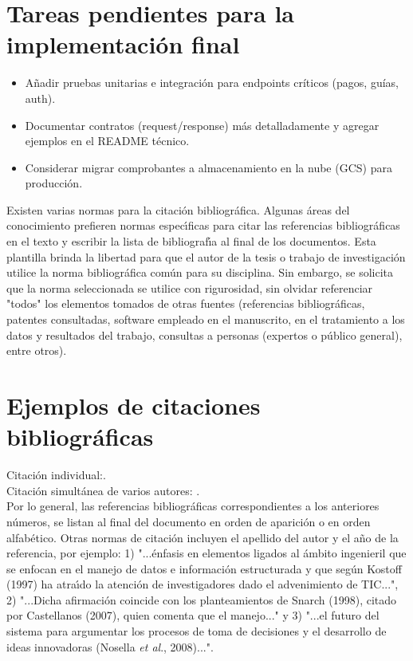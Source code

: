 \section{Tareas pendientes para la implementación final}
\begin{itemize}
\item Añadir pruebas unitarias e integración para endpoints críticos (pagos, guías, auth).
\item Documentar contratos (request/response) más detalladamente y agregar ejemplos en el README técnico.
\item Considerar migrar comprobantes a almacenamiento en la nube (GCS) para producción.
\end{itemize}
Existen varias normas para la citaci\'{o}n bibliogr\'{a}fica. Algunas \'{a}reas del conocimiento prefieren normas espec\'{\i}ficas para citar las referencias bibliogr\'{a}ficas en el texto y escribir la lista de bibliograf\'{\i}a al final de los documentos. Esta plantilla brinda la libertad para que el autor de la tesis  o trabajo de investigaci\'{o}n utilice la norma bibliogr\'{a}fica com\'{u}n para su disciplina. Sin embargo, se solicita que la norma seleccionada se utilice con rigurosidad, sin olvidar referenciar "todos" los elementos tomados de otras fuentes (referencias bibliogr\'{a}ficas, patentes consultadas, software empleado en el manuscrito, en el tratamiento a los datos y resultados del trabajo, consultas a personas (expertos o p\'{u}blico general), entre otros).\\

\section{Ejemplos de citaciones bibliogr\'{a}ficas}

Citaci\'{o}n individual:\cite{AG01}.\\
Citaci\'{o}n simult\'{a}nea de varios autores:
\cite{AG12,AG52,AG70,AG08a,AG09a,AG36a,AG01i}.\\

Por lo general, las referencias bibliogr\'{a}ficas correspondientes a los anteriores n\'{u}meros, se listan al final del documento en orden de aparici\'{o}n o en orden alfab\'{e}tico. Otras normas de citaci\'{o}n incluyen el apellido del autor y el a\~{n}o de la referencia, por ejemplo: 1) "...\'{e}nfasis en elementos ligados al \'{a}mbito ingenieril que se enfocan en el manejo de datos e informaci\'{o}n estructurada y que seg\'{u}n Kostoff (1997) ha atra\'{\i}do la atenci\'{o}n de investigadores dado el advenimiento de TIC...", 2) "...Dicha afirmaci\'{o}n coincide con los planteamientos de Snarch (1998), citado por Castellanos (2007), quien comenta que el manejo..." y 3) "...el futuro del sistema para argumentar los procesos de toma de decisiones y el desarrollo de ideas innovadoras (Nosella \textsl{et al}., 2008)...".\\

